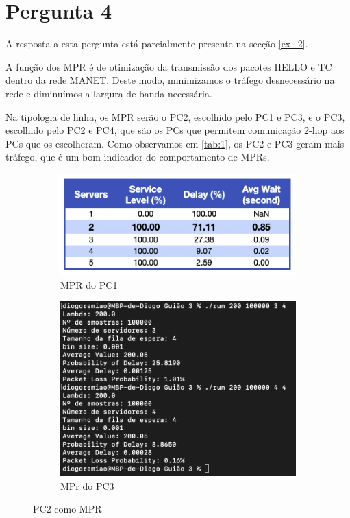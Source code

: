 \chapter{Pergunta 4} \label{ex_4}

A resposta a esta pergunta está parcialmente presente na secção \ref{ex_2}.

A função dos MPR é de otimização da transmissão dos pacotes HELLO e TC dentro da rede MANET.
Deste modo, minimizamos o tráfego desnecessário na rede e diminuímos a largura de banda necessária.

Na tipologia de linha, os MPR serão o PC2, escolhido pelo PC1 e PC3, e o PC3, escolhido pelo PC2 e PC4, que são os PCs que permitem comunicação 2-hop aos PCs que os escolheram.
Como observamos em \ref{tab:1}, os PC2 e PC3 geram mais tráfego, que é um bom indicador do comportamento de MPRs.

\begin{figure}[H]
    \centering
    \begin{subfigure}{.5\textwidth}
      \centering
      \includegraphics[width=.9\linewidth]{figs/image_4.png}
      \caption{MPR do PC1}
      \label{fig:4_1}
    \end{subfigure}%
    \begin{subfigure}{.5\textwidth}
      \centering
      \includegraphics[width=.9\linewidth]{figs/image_6.png}
      \caption{MPr do PC3}
      \label{fig:4_2}
    \end{subfigure}
    \caption{PC2 como MPR}
    \label{fig:4}
\end{figure}

